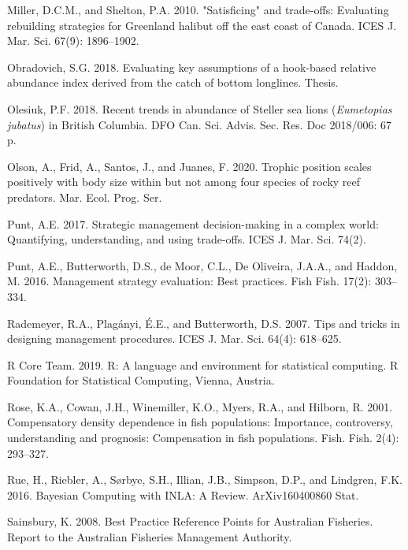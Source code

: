 \documentclass[11pt]{book}
\begin{document}
\leavevmode\hypertarget{ref-miller2010}{}%
Miller, D.C.M., and Shelton, P.A. 2010. "Satisficing" and trade-offs: Evaluating rebuilding strategies for Greenland halibut off the east coast of Canada. ICES J. Mar. Sci. 67(9): 1896--1902.

\leavevmode\hypertarget{ref-obradovich2018}{}%
Obradovich, S.G. 2018. Evaluating key assumptions of a hook-based relative abundance index derived from the catch of bottom longlines. Thesis.

\leavevmode\hypertarget{ref-olesiuk2018}{}%
Olesiuk, P.F. 2018. Recent trends in abundance of Steller sea lions (\emph{Eumetopias jubatus}) in British Columbia. DFO Can. Sci. Advis. Sec. Res. Doc 2018/006: 67 p.

\leavevmode\hypertarget{ref-olson2020}{}%
Olson, A., Frid, A., Santos, J., and Juanes, F. 2020. Trophic position scales positively with body size within but not among four species of rocky reef predators. Mar. Ecol. Prog. Ser.

\leavevmode\hypertarget{ref-punt2017}{}%
Punt, A.E. 2017. Strategic management decision-making in a complex world: Quantifying, understanding, and using trade-offs. ICES J. Mar. Sci. 74(2).

\leavevmode\hypertarget{ref-punt2016}{}%
Punt, A.E., Butterworth, D.S., de Moor, C.L., De Oliveira, J.A.A., and Haddon, M. 2016. Management strategy evaluation: Best practices. Fish Fish. 17(2): 303--334.

\leavevmode\hypertarget{ref-rademeyer2007}{}%
Rademeyer, R.A., Plagányi, É.E., and Butterworth, D.S. 2007. Tips and tricks in designing management procedures. ICES J. Mar. Sci. 64(4): 618--625.

\leavevmode\hypertarget{ref-r2019}{}%
R Core Team. 2019. R: A language and environment for statistical computing. R Foundation for Statistical Computing, Vienna, Austria.

\leavevmode\hypertarget{ref-rose2001}{}%
Rose, K.A., Cowan, J.H., Winemiller, K.O., Myers, R.A., and Hilborn, R. 2001. Compensatory density dependence in fish populations: Importance, controversy, understanding and prognosis: Compensation in fish populations. Fish. Fish. 2(4): 293--327.

\leavevmode\hypertarget{ref-rue2016}{}%
Rue, H., Riebler, A., Sørbye, S.H., Illian, J.B., Simpson, D.P., and Lindgren, F.K. 2016. Bayesian Computing with INLA: A Review. ArXiv160400860 Stat.

\leavevmode\hypertarget{ref-sainsbury2008}{}%
Sainsbury, K. 2008. Best Practice Reference Points for Australian Fisheries. Report to the Australian Fisheries Management Authority.
\end{document}
